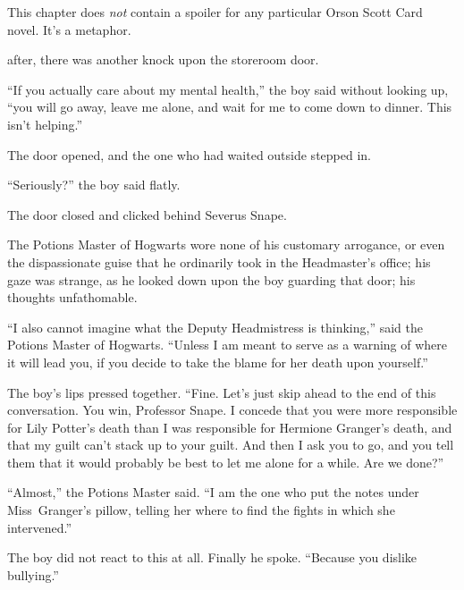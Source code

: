 
\begin{chapterOpeningAuthorNote}
This chapter does \emph{not} contain a spoiler for any particular Orson Scott Card novel. It’s a metaphor.
\end{chapterOpeningAuthorNote}

 after, there was another knock upon the storeroom door.

\hplettrineextrapara
“If you actually care about my mental health,” the boy said without looking up, “you will go away, leave me alone, and wait for me to come down to dinner. This isn’t helping.”

The door opened, and the one who had waited outside stepped in.

“Seriously?” the boy said flatly.

The door closed and clicked behind Severus Snape.

The Potions Master of Hogwarts wore none of his customary arrogance, or even the dispassionate guise that he ordinarily took in the Headmaster’s office; his gaze was strange, as he looked down upon the boy guarding that door; his thoughts unfathomable.

“I also cannot imagine what the Deputy Headmistress is thinking,” said the Potions Master of Hogwarts. “Unless I am meant to serve as a warning of where it will lead you, if you decide to take the blame for her death upon yourself.”

The boy’s lips pressed together. “Fine. Let’s just skip ahead to the end of this conversation. You win, Professor Snape. I concede that you were more responsible for Lily Potter’s death than I was responsible for Hermione Granger’s death, and that my guilt can’t stack up to your guilt. And then I ask you to go, and you tell them that it would probably be best to let me alone for a while. Are we done?”

“Almost,” the Potions Master said. “I am the one who put the notes under Miss~Granger’s pillow, telling her where to find the fights in which she intervened.”

The boy did not react to this at all. Finally he spoke. “Because you dislike bullying.”

